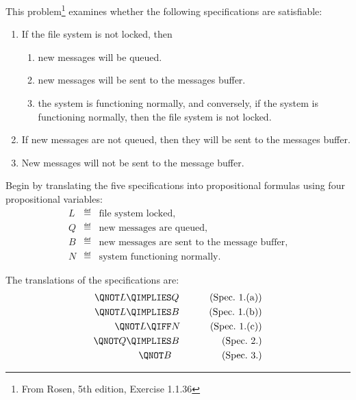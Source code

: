 \documentclass[handout]{mcs}
\begin{document}
\insolutions{\newpage}
\begin{problem} 
\label{sys}
This problem\footnote{From Rosen, 5th edition, Exercise 1.1.36} examines
whether the following specifications are satisfiable:

\begin{enumerate}

\item If the file system is not locked, then

   \begin{enumerate}

   \item new messages will be queued.

   \item new messages will be sent to the messages buffer.

   \item the system is functioning normally, and conversely, if the system
         is functioning normally, then the file system is not locked.

   \end{enumerate}

\item  If new messages are not queued, then they will be sent to
the messages buffer.

\item  New messages will not be sent to the message buffer.

\end{enumerate}

\bparts

\ppart Begin by translating the five specifications into
propositional formulas using four propositional variables:
\begin{eqnarray*}
L   & \eqdef &   \text{file system locked}, \\
Q   & \eqdef &   \text{new messages are queued}, \\
B   & \eqdef &   \text{new messages are sent to the message buffer}, \\
N   & \eqdef &   \text{system functioning normally}.
\end{eqnarray*}

\begin{solution}

The translations of the specifications are:
\begin{align}
\QNOT L  \QIMPLIES & Q & \tag{Spec.\ 1.(a)}\\
\QNOT L  \QIMPLIES & B & \tag{Spec.\ 1.(b)}\\
\QNOT L  \QIFF  & N & \tag{Spec.\ 1.(c)}\\
\QNOT Q  \QIMPLIES & B & \tag{Spec.\ 2.}\\
\QNOT B           &   & \tag{Spec.\ 3.}
\end{align}
\end{solution}


\end{problem}
\end{document}
